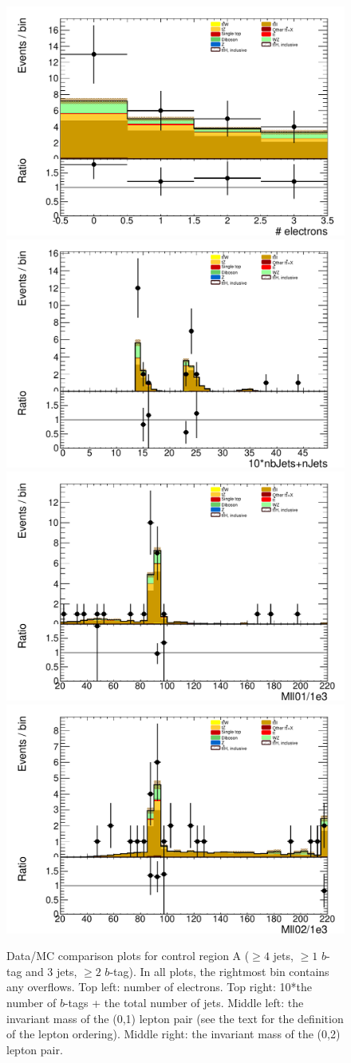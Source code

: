 \begin{figure}
 \begin{center}
\includegraphics[width=.5\linewidth]{figs/ttZ/ttz_3l_CR_nelec}%
\includegraphics[width=.5\linewidth]{figs/ttZ/ttz_3l_CR_nJets_and_nbJets_lin}\\
\includegraphics[width=.5\linewidth]{figs/ttZ/ttz_3l_CR_Mll01}%
\includegraphics[width=.5\linewidth]{figs/ttZ/ttz_3l_CR_Mll02}\\
  \caption{\label{figure:background_ttZCRA}Data/MC comparison plots for \ttZ control region A ($\ge4$ jets, $\ge1$ $b$-tag and 3 jets, $\ge 2$ $b$-tag). In all plots, the rightmost bin contains any overflows.  Top left: number of electrons.  Top right: 10*the number of $b$-tags + the total number of jets. Middle left: the invariant mass of the (0,1) lepton pair (see the text for the definition of the lepton ordering).  Middle right: the invariant mass of the (0,2) lepton pair.}
 \end{center}
\end{figure}



